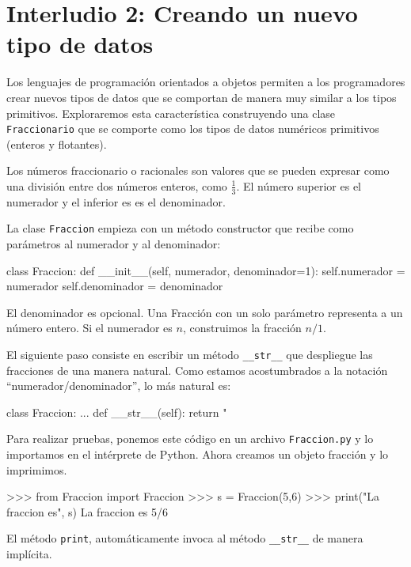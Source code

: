 
\chapter{Interludio 2: Creando un nuevo tipo de datos }

\label{overloading} 

Los lenguajes de programación orientados a objetos permiten a los
programadores crear nuevos tipos de datos que se comportan de manera
muy similar a los tipos primitivos. Exploraremos esta característica
construyendo una clase \texttt{Fraccionario} que se comporte como
los tipos de datos numéricos primitivos (enteros y flotantes).

Los números fraccionario o racionales son valores que se pueden expresar
como una división entre dos números enteros, como $\frac{1}{3}$.
El número superior es el numerador y el inferior es es el denominador.

   

La clase \texttt{Fraccion} empieza con un método constructor que recibe
como parámetros al numerador y al denominador:

\begin{pythoncode}
class Fraccion:
  def __init__(self, numerador, denominador=1):
    self.numerador = numerador
    self.denominador = denominador
\end{pythoncode}
El denominador es opcional. Una Fracción con un solo parámetro representa
a un número entero. Si el numerador es $n$, construimos la fracción
$n/1$.

El siguiente paso consiste en escribir un método \texttt{\_\_str\_\_}
que despliegue las fracciones de una manera natural. Como estamos
acostumbrados a la notación ``numerador/denominador'', lo más natural
es:

\begin{pythoncode}
class Fraccion:
  ...
  def __str__(self):
    return "%
\end{pythoncode}
 Para realizar pruebas, ponemos este código en un archivo \texttt{Fraccion.py}
y lo importamos en el intérprete de Python. Ahora creamos un objeto
fracción y lo imprimimos.

\begin{pythoncode}
>>> from Fraccion import Fraccion
>>> s = Fraccion(5,6)
>>> print("La fraccion es", s)
La fraccion es 5/6
\end{pythoncode}
 El método \texttt{print}, automáticamente invoca al método \texttt{\_\_str\_\_}
de manera implícita.

